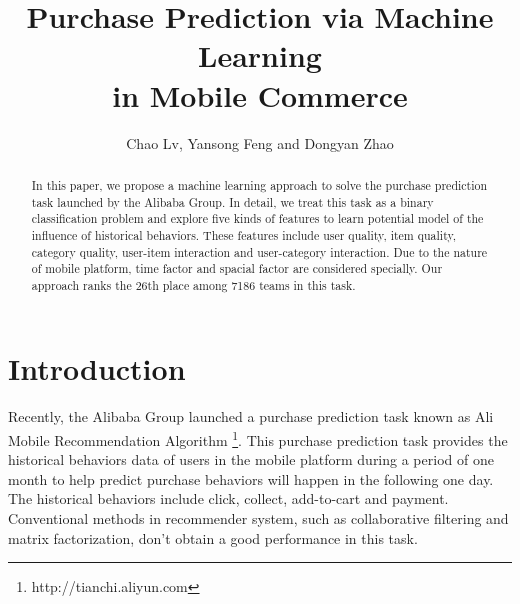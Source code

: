 \documentclass{llncs}
\begin{document}
%
\title{Purchase Prediction via Machine Learning\\
in Mobile Commerce}
%
\author{
	Chao Lv, Yansong Feng and Dongyan Zhao\inst{*}
}
%
%
\maketitle
%
\begin{abstract}
In this paper, we propose a machine learning approach
to solve the purchase prediction task launched by the Alibaba Group.
In detail, we treat this task as a binary classification problem
and explore five kinds of features to learn potential model
of the influence of historical behaviors.
These features include user quality, item quality, category quality,
user-item interaction and user-category interaction.
Due to the nature of mobile platform,
time factor and spacial factor are considered specially.
Our approach ranks the 26th place among 7186 teams in this task.
\end{abstract}
%
\section{Introduction}
%
Recently, the Alibaba Group launched a purchase prediction task known as
Ali Mobile Recommendation Algorithm \footnote{http://tianchi.aliyun.com}.
This purchase prediction task provides the historical behaviors data of users
in the mobile platform during a period of one month
to help predict purchase behaviors will happen in the following one day.
The historical behaviors include click, collect, add-to-cart and payment.
Conventional methods in recommender system\cite{lu2012recommender},
such as collaborative filtering and matrix factorization,
don't obtain a good performance in this task.
\end{document}

